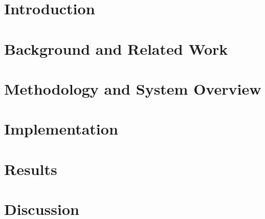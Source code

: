 \documentclass[a4paper, 11pt, openany]{book} %
\begin{document}
\pagestyle{fancy} %
\fancyhf{} %
\renewcommand{\headrulewidth}{0pt} %
\fancyhead[LE, RO]{\thepage} %
\fancyhead[RE, LO]{\leftmark} %
\setlength{\headheight}{14.49998pt} %



\chapter{Introduction}

\cleardoublepage


\chapter{Background and Related Work}

\cleardoublepage


\chapter{Methodology and System Overview}

\cleardoublepage


\chapter{Implementation}

\cleardoublepage


\chapter{Results}

\cleardoublepage


\chapter{Discussion}

\cleardoublepage
\end{document}
